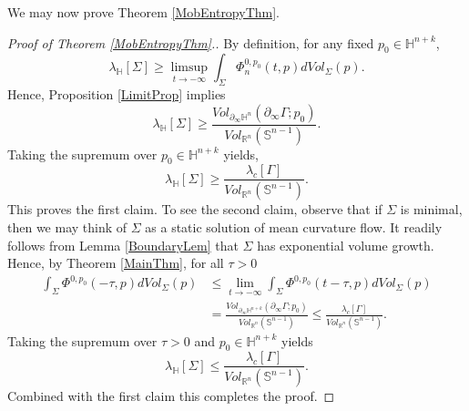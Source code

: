 \documentclass{amsart}
\theoremstyle{definition}
\theoremstyle{remark}
\numberwithin{equation}{section}
\newcommand{\Real}{\mathbb R}
\begin{document}
We may now prove Theorem \ref{MobEntropyThm}.
\begin{proof}[Proof of Theorem \ref{MobEntropyThm}.]
By definition, for any fixed $p_0\in \mathbb{H}^{n+k}$,
$$
\lambda_{\mathbb{H}}[\Sigma]\geq \limsup_{t\to -\infty} \int_{\Sigma} \Phi^{0, p_0}_n (t,p) dVol_{\Sigma}(p).
$$
Hence, Proposition \ref{LimitProp} implies
$$
\lambda_{\mathbb{H}}[\Sigma]\geq  \frac{Vol_{\partial_\infty \mathbb{H}^n}(\partial_\infty \Gamma; p_0)}{Vol_{\Real^{n}}(\mathbb{S}^{n-1})}.
$$
Taking the supremum over $p_0\in\mathbb{H}^{n+k}$ yields, 
$$
\lambda_{\mathbb{H}}[\Sigma]\geq\frac{\lambda_{c}[\Gamma]}{Vol_{\Real^{n}}(\mathbb{S}^{n-1})}.
$$
This proves the first claim.  To see the second claim, observe that if $\Sigma$ is minimal, then we may think of $\Sigma$ as a static solution of mean curvature flow. It readily follows from Lemma \ref{BoundaryLem} that $\Sigma$ has exponential volume growth. Hence, by Theorem \ref{MainThm}, for all $\tau>0$
\begin{align*}
 \int_{\Sigma} \Phi^{0, p_0} (-\tau,p) dVol_{\Sigma}(p) &\leq \lim_{t\to -\infty} \int_{\Sigma} \Phi^{0, p_0} (t-\tau,p) dVol_{\Sigma}(p)\\
 &= \frac{Vol_{\partial_\infty \mathbb{H}^{n+k}}(\partial_\infty \Gamma; p_0)}{Vol_{\Real^{n}}(\mathbb{S}^{n-1})}\leq \frac{\lambda_{c}[\Gamma]}{Vol_{\Real^{n}}(\mathbb{S}^{n-1})}.
\end{align*}
Taking the supremum over $\tau>0$ and $p_0\in \mathbb{H}^{n+k}$ yields
$$
\lambda_{\mathbb{H}}[\Sigma]\leq \frac{\lambda_{c}[\Gamma]}{Vol_{\Real^{n}}(\mathbb{S}^{n-1})}.
$$
Combined with the first claim this completes the proof.
\end{proof}
\end{document}
